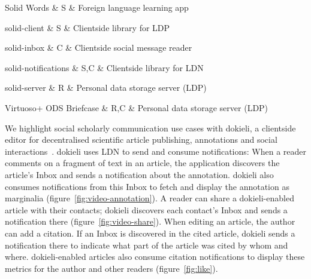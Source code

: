\documentclass[a4paper]{llncs}
\begin{document}
{                                        Solid Words &
                                        S &
                                        Foreign language learning app \NN


                                        solid-client &
                                        S &
                                        Clientside library for LDP \NN


                                        solid-inbox &
                                        C &
                                        Clientside social message reader \NN


                                        solid-notifications &
                                        S,C &
                                        Clientside library for LDN \NN


                                        solid-server &
                                        R &
                                        Personal data storage server (LDP) \NN


                                        Virtuoso+ ODS Briefcase &
                                        R,C &
                                        Personal data storage server (LDP) \LL
}





\par We highlight social scholarly communication use cases with \empty dokieli, a clientside editor for decentralised scientific article publishing, annotations and social interactions~\cite{ref-17}. dokieli uses LDN to send and consume notifications: When a reader comments on a fragment of text in an article, the application discovers the article’s Inbox and sends a notification about the annotation. dokieli also consumes notifications from this Inbox to fetch and display the annotation as marginalia (figure~\ref{fig:video-annotation}). A reader can share a dokieli-enabled article with their contacts; dokieli discovers each contact’s Inbox and sends a notification there (figure~\ref{fig:video-share}). When editing an article, the author can add a citation. If an Inbox is discovered in the cited article, dokieli sends a notification there to indicate what part of the article was cited by whom and where. dokieli-enabled articles also consume citation notifications to display these metrics for the author and other readers (figure~\ref{fig:like}).
\end{document}
